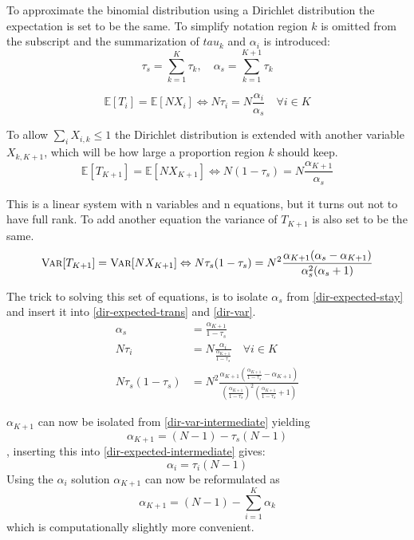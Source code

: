 To approximate the binomial distribution using a Dirichlet distribution the expectation is set to be the same. To simplify notation region $k$ is omitted from the subscript and the summarization of $tau_k$ and $\alpha_i$ is introduced:
\begin{equation}
\tau_s = \sum_{k = 1}^{K} \tau_k, \quad \alpha_s = \sum_{k = 1}^{K+1} \tau_k
\end{equation}

\begin{equation}
\mathbb{E}[T_{i}] = \mathbb{E}[N X_i] \Leftrightarrow N \tau_i = N \frac{\alpha_i}{\alpha_s} \quad \forall i \in K
\label{dir-expected-trans}
\end{equation}

To allow $\sum_{i} X_{i,k} \le 1$ the Dirichlet distribution is extended with another variable $X_{k, K+1}$, which will be how large a proportion region $k$ should keep.
\begin{equation}
\mathbb{E}[T_{K+1}] = \mathbb{E}[N X_{K+1}] \Leftrightarrow N \left(1 - \tau_s\right) = N \frac{\alpha_{K+1}}{\alpha_s}
\label{dir-expected-stay}
\end{equation}
  
This is a linear system with n variables and n equations, but it turns out not to have full rank. To add another equation the variance of $T_{K+1}$ is also set to be the same.
\begin{equation}
\textsc{Var}[T_{K+1}] = \textsc{Var}[N X_{K+1}] \Leftrightarrow N\tau_s (1 - \tau_s) = N^2 \frac{\alpha_{K+1}(\alpha_s - \alpha_{K+1})}{\alpha_s^2 (\alpha_s + 1)}
\label{dir-var}
\end{equation}

The trick to solving this set of equations, is to isolate $\alpha_s$ from \eqref{dir-expected-stay} and insert it into \eqref{dir-expected-trans} and \eqref{dir-var}.
\begin{align}
\alpha_s &= \frac{\alpha_{K+1}}{1 - \tau_s} \label{dir-expected-intermediate} \\
N \tau_i &= N \frac{\alpha_i}{\frac{\alpha_{K+1}}{1 - \tau_s}} \quad \forall i \in K \\
N\tau_s (1 - \tau_s) &= N^2 \frac{\alpha_{K+1}\left(\frac{\alpha_{K+1}}{1 - \tau_s} - \alpha_{K+1}\right)}{\left(\frac{\alpha_{K+1}}{1 - \tau_s}\right)^2 \left(\frac{\alpha_{K+1}}{1 - \tau_s} + 1\right)} \label{dir-var-intermediate}
\end{align}

$\alpha_{K+1}$ can now be isolated from \eqref{dir-var-intermediate} yielding
\begin{equation}
\alpha_{K+1} = (N - 1) - \tau_s (N - 1)
\end{equation}
, inserting this into \eqref{dir-expected-intermediate} gives:
\begin{equation}
\alpha_{i} = \tau_i (N - 1)
\end{equation}
Using the $\alpha_{i}$ solution $\alpha_{K+1}$ can now be reformulated as
\begin{equation}
\alpha_{K+1} = (N - 1) - \sum_{i=1}^K \alpha_k
\end{equation}
which is computationally slightly more convenient.

